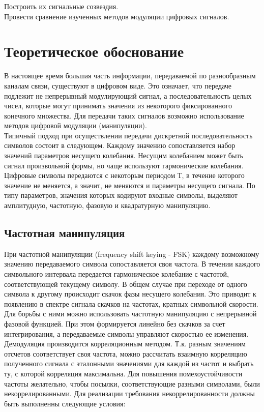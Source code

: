 \documentclass[a4paper,14pt]{article}
\begin{document}
Построить их сигнальные созвездия.\\
	
Провести сравнение изученных методов модуляции цифровых сигналов.\\
	
\section{Теоретическое обоснование}

В настоящее время большая часть информации, передаваемой по разнообразным каналам связи, существуют в цифровом виде. Это означает, что передаче подлежит не непрерывный модулирующий сигнал, а последовательность целых чисел, которые могут принимать значения из некоторого фиксированного конечного множества. Для передачи таких сигналов возможно использование методов цифровой модуляции (манипуляции). \\
Типичный подход при осуществлении передачи дискретной последовательность символов состоит в следующем. Каждому значению сопоставляется набор значений параметров несущего колебания. Несущим колебанием может быть сигнал произвольной формы, но чаще используют гармонические колебания. Цифровые символы передаются с некоторым периодом Т, в течение которого значение не меняется, а значит, не меняются и параметры несущего сигнала. По типу параметров, значения которых кодируют входные символы, выделяют амплитудную, частотную, фазовую и квадратурную манипуляцию.

\subsection{Частотная манипуляция}

При частотной манипуляции (frequency shift keying - FSK) каждому возможному значению передаваемого символа сопоставляется своя частота. В течении каждого символьного интервала передается гармоническое колебание с частотой, соответствующей текущему символу. В общем случае при переходе от одного символа к другому происходит скачок фазы несущего колебания. Это приводит к появлению в спектре сигнала скачков на частотах, кратных символьной скорости. Для борьбы с ними можно использовать частотную манипуляцию с непрерывной фазовой функцией.
При этом формируется линейно без скачков за счет интегрирования, а передаваемые символы управляют скоростью ее изменения.\\
 Демодуляция производится корреляционным методом. Т.к. разным значениям отсчетов соответствует своя частота, можно рассчитать взаимную корреляцию полученного сигнала с эталонными значениями для каждой из частот и выбрать ту, с которой корреляция максимальна.
Для повышения помехоустойчивости частоты желательно, чтобы посылки, соответствующие разными символами, были некоррелированными. Для реализации требования некоррелированности должны быть выполненны следующие условия:
\end{document}
